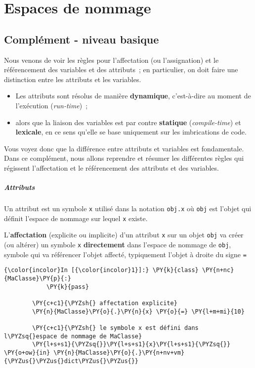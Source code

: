     
    
    
    

    

    \hypertarget{espaces-de-nommage}{%
\section{Espaces de nommage}\label{espaces-de-nommage}}

    \hypertarget{compluxe9ment---niveau-basique}{%
\subsection{Complément - niveau
basique}\label{compluxe9ment---niveau-basique}}

    Nous venons de voir les règles pour l'affectation (ou l'assignation) et
le référencement des variables et des attributs~; en particulier, on
doit faire une distinction entre les attributs et les variables.

    \begin{itemize}
\tightlist
\item
  Les attributs sont résolus de manière \textbf{dynamique}, c'est-à-dire
  au moment de l'exécution (\emph{run-time})~;
\item
  alors que la liaison des variables est par contre \textbf{statique}
  (\emph{compile-time}) et \textbf{lexicale}, en ce sens qu'elle se base
  uniquement sur les imbrications de code.
\end{itemize}

    Vous voyez donc que la différence entre attributs et variables est
fondamentale. Dans ce complément, nous allons reprendre et résumer les
différentes règles qui régissent l'affectation et le référencement des
attributs et des variables.

    \hypertarget{attributs}{%
\subparagraph{Attributs}\label{attributs}}

    Un attribut est un symbole \texttt{x} utilisé dans la notation
\texttt{obj.x} où \texttt{obj} est l'objet qui définit l'espace de
nommage sur lequel \texttt{x} existe.

L'\textbf{affectation} (explicite ou implicite) d'un attribut \texttt{x}
sur un objet \texttt{obj} va créer (ou altérer) un symbole \texttt{x}
\textbf{directement} dans l'espace de nommage de \texttt{obj}, symbole
qui va référencer l'objet affecté, typiquement l'objet à droite du signe
\texttt{=}

    \begin{Verbatim}[commandchars=\\\{\},frame=single,framerule=0.3mm,rulecolor=\color{cellframecolor}]
{\color{incolor}In [{\color{incolor}1}]:} \PY{k}{class} \PY{n+nc}{MaClasse}\PY{p}{:}
            \PY{k}{pass}
        
        \PY{c+c1}{\PYZsh{} affectation explicite}
        \PY{n}{MaClasse}\PY{o}{.}\PY{n}{x} \PY{o}{=} \PY{l+m+mi}{10} 
        
        \PY{c+c1}{\PYZsh{} le symbole x est défini dans l\PYZsq{}espace de nommage de MaClasse}
        \PY{l+s+s1}{\PYZsq{}}\PY{l+s+s1}{x}\PY{l+s+s1}{\PYZsq{}} \PY{o+ow}{in} \PY{n}{MaClasse}\PY{o}{.}\PY{n+nv+vm}{\PYZus{}\PYZus{}dict\PYZus{}\PYZus{}}
\end{Verbatim}


